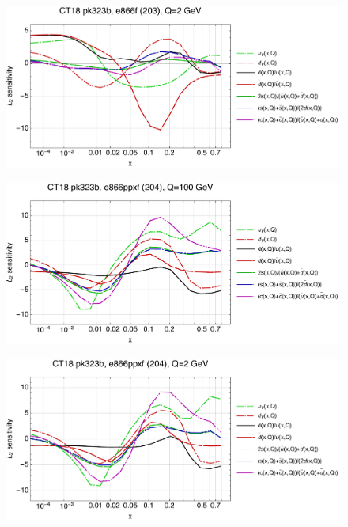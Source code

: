 \documentclass[10pt,aps,prd,floatfix,titlepage]{revtex4}
\begin{document}
\begin{figure}
\includegraphics[width=\textwidth,height=0.44\textheight,keepaspectratio]{2/203_ct18nn_q2_Sf_2.pdf}
\caption{}
\end{figure}
\clearpage
\begin{figure}
\includegraphics[width=\textwidth,height=0.44\textheight,keepaspectratio]{2/204_ct18nn_q100_Sf_2.pdf}
\caption{}
\end{figure}
\begin{figure}
\includegraphics[width=\textwidth,height=0.44\textheight,keepaspectratio]{2/204_ct18nn_q2_Sf_2.pdf}
\caption{}
\end{figure}
\end{document}
